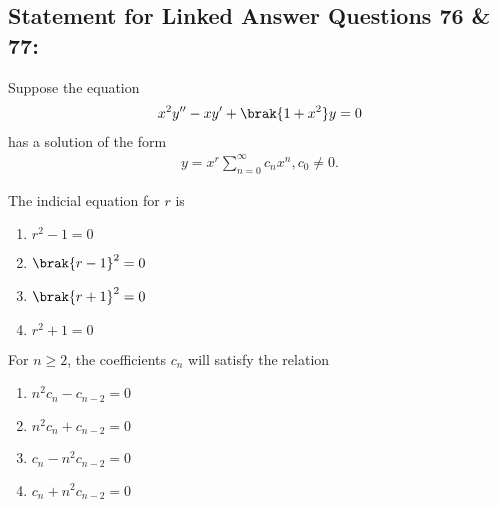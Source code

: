 \subsection*{Statement for Linked Answer Questions 76 \& 77:}
Suppose the equation 
\begin{align*}
    x^2 y^{{\prime}{\prime}} - x y^{\prime} + \brak{1+x^2} y = 0
\end{align*}
has a solution of the form
\begin{align*}
    y = x^{r} \sum^{\infty}_{n=0} c_n x^n, c_0 \neq 0.
\end{align*}
\item The indicial equation for $r$ is
\begin{multicols}{2}
    \begin{enumerate}
        \item $r^2 - 1 = 0$
        \item $\brak{r-1}^2 = 0$
        \item $\brak{r+1}^2 = 0$
        \item $r^2+1 = 0$
    \end{enumerate}
\end{multicols}
\item For $n\geq 2 $, the coefficients $c_n$ will satisfy the relation
\begin{multicols}{2}
    \begin{enumerate}
        \item $n^2 c_n - c_{n-2} = 0$
        \item $n^2 c_n + c_{n-2} = 0$
        \item $c_n - n^2 c_{n-2} = 0$
        \item $c_n + n^2 c_{n-2} = 0$
    \end{enumerate}
\end{multicols}

